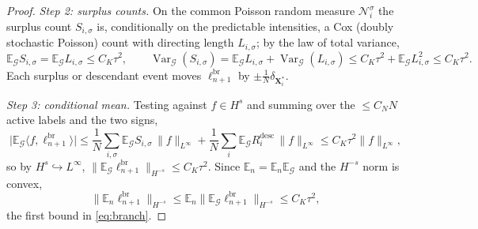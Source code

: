 \documentclass[a4paper,fleqn]{cas-sc}
\theoremstyle{definition}
\theoremstyle{remark}
\begin{document}
\begin{proof}
\emph{Step 2: surplus counts.} On the common Poisson random measure
$\mathcal N^\sigma_i$ the surplus count $S_{i,\sigma}$ is, conditionally on the
predictable intensities, a Cox (doubly stochastic Poisson) count with directing
length $L_{i,\sigma}$; by the law of total variance,
\[
\mathbb E_{\mathcal G}S_{i,\sigma}=\mathbb E_{\mathcal G}L_{i,\sigma}\le C_K\tau^2,
\qquad
\operatorname{Var}_{\mathcal G}(S_{i,\sigma})
=\mathbb E_{\mathcal G}L_{i,\sigma}+\operatorname{Var}_{\mathcal G}(L_{i,\sigma})
\le C_K\tau^2+\mathbb E_{\mathcal G}L_{i,\sigma}^2\le C_K\tau^2 .
\]
Each surplus or descendant event moves $\ell^{\mathrm{br}}_{n+1}$ by
$\pm\frac1N\delta_{\mathbf X^*_i}$.

\emph{Step 3: conditional mean.} Testing against $f\in H^s$ and summing over the
$\le C_NN$ active labels and the two signs,
\[
\bigl|\mathbb E_{\mathcal G}\langle f,\ell^{\mathrm{br}}_{n+1}\rangle\bigr|
\le\frac1N\sum_{i,\sigma}\mathbb E_{\mathcal G}S_{i,\sigma}\,\|f\|_{L^\infty}
+\frac1N\sum_i\mathbb E_{\mathcal G}R^{\mathrm{desc}}_i\,\|f\|_{L^\infty}
\le C_K\tau^2\|f\|_{L^\infty},
\]
so by $H^s\hookrightarrow L^\infty$,
$\|\mathbb E_{\mathcal G}\ell^{\mathrm{br}}_{n+1}\|_{H^{-s}}\le C_K\tau^2$. Since
$\mathbb E_n=\mathbb E_n\mathbb E_{\mathcal G}$ and the $H^{-s}$ norm is convex,
\[
\|\mathbb E_n\ell^{\mathrm{br}}_{n+1}\|_{H^{-s}}
\le\mathbb E_n\|\mathbb E_{\mathcal G}\ell^{\mathrm{br}}_{n+1}\|_{H^{-s}}\le C_K\tau^2,
\]
the first bound in \eqref{eq:branch}.


\end{proof}
\end{document}
